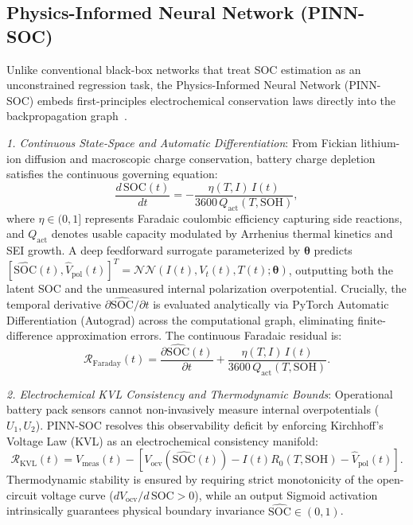 \documentclass[balance,nocopyright,upint,varvw,hyphenate,barcolor=NavyBlue,nolists]{asmejour}
\begin{document}
\subsection{Physics-Informed Neural Network (PINN-SOC)}
Unlike conventional black-box networks that treat SOC estimation as an unconstrained regression task, the Physics-Informed Neural Network (PINN-SOC) embeds first-principles electrochemical conservation laws directly into the backpropagation graph~\cite{Raissi2019pinn,Brancato2026,Li2023nature}.

\emph{1. Continuous State-Space and Automatic Differentiation}: From Fickian lithium-ion diffusion and macroscopic charge conservation, battery charge depletion satisfies the continuous governing equation:
\begin{equation}\label{eqn:pinn_ode}
\frac{d\,\text{SOC}(t)}{dt} = -\frac{\eta(T, I)\, I(t)}{3600\,Q_{\text{act}}(T, \text{SOH})},
\end{equation}
where $\eta \in (0, 1]$ represents Faradaic coulombic efficiency capturing side reactions, and $Q_{\text{act}}$ denotes usable capacity modulated by Arrhenius thermal kinetics and SEI growth. A deep feedforward surrogate parameterized by $\boldsymbol{\theta}$ predicts $[\widehat{\text{SOC}}(t), \hat{V}_{\text{pol}}(t)]^T = \mathcal{NN}(I(t), V_t(t), T(t); \boldsymbol{\theta})$, outputting both the latent SOC and the unmeasured internal polarization overpotential. Crucially, the temporal derivative $\partial \widehat{\text{SOC}}/\partial t$ is evaluated analytically via PyTorch Automatic Differentiation (Autograd) across the computational graph, eliminating finite-difference approximation errors. The continuous Faradaic residual is:
\begin{equation}\label{eqn:res_faraday}
\mathcal{R}_{\text{Faraday}}(t) = \frac{\partial \widehat{\text{SOC}}(t)}{\partial t} + \frac{\eta(T, I)\, I(t)}{3600\,Q_{\text{act}}(T, \text{SOH})}.
\end{equation}

\emph{2. Electrochemical KVL Consistency and Thermodynamic Bounds}: Operational battery pack sensors cannot non-invasively measure internal overpotentials ($U_1, U_2$). PINN-SOC resolves this observability deficit by enforcing Kirchhoff's Voltage Law (KVL) as an electrochemical consistency manifold:
\begin{equation}\label{eqn:res_kvl}
\mathcal{R}_{\text{KVL}}(t) = V_{\text{meas}}(t) - \left[ V_{\text{ocv}}(\widehat{\text{SOC}}(t)) - I(t) R_0(T, \text{SOH}) - \hat{V}_{\text{pol}}(t) \right].
\end{equation}
Thermodynamic stability is ensured by requiring strict monotonicity of the open-circuit voltage curve ($d V_{\text{ocv}}/d\,\text{SOC} > 0$), while an output Sigmoid activation intrinsically guarantees physical boundary invariance $\widehat{\text{SOC}} \in (0, 1)$.
\end{document}

